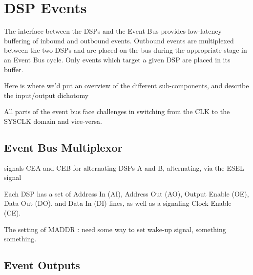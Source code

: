 \section{DSP Events}

The interface between the DSPs and the Event Bus provides low-latency
buffering of inbound and outbound events. Outbound events are
multiplexed between the two DSPs and are placed on the bus during the
appropriate stage in an Event Bus cycle. Only events which target a
given DSP are placed in its buffer.

Here is where we'd put an overview of the different sub-components,
and describe the input/output dichotomy

All parts of the event bus face challenges in switching from the CLK
to the SYSCLK domain and vice-versa.

\subsection{Event Bus Multiplexor}
      
      signals CEA and CEB for alternating DSPs A and B, alternating, via the ESEL signal
      
      Each DSP has a set of Address In (AI), Address Out (AO), Output Enable (OE), Data Out (DO), and Data In (DI) lines, as well as a signaling Clock Enable (CE). 

      The setting of MADDR : need some way to set wake-up signal, something something. 

      

\subsection{Event Outputs}

